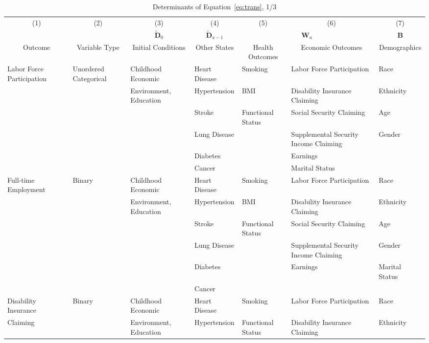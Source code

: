 \begin{table}
\caption{Determinants of Equation~\eqref{eq:trans}, 1/3} \label{table:supertab1}
\begin{scriptsize}
\begin{tabular}{lllllll}
\toprule 
\multicolumn{1}{c}{(1)} & \multicolumn{1}{c}{(2)} & \multicolumn{1}{c}{(3)} & \multicolumn{1}{c}{(4)} & \multicolumn{1}{c}{(5)} & \multicolumn{1}{c}{(6)} & \multicolumn{1}{c}{(7)} \\
 & &  \multicolumn{1}{c}{$\tilde{\bm{D}}_0$} &  \multicolumn{1}{c}{$\tilde{\bm{D}}_{a-1}$} & \multicolumn{2}{c}{ $\bm{W}_a$ } &  \multicolumn{1}{c}{$\bm{B}$} \\ 
\multicolumn{1}{c}{Outcome} & \multicolumn{1}{c}{Variable Type} & \multicolumn{1}{c}{Initial Conditions} & \multicolumn{1}{c}{Other States} & \multicolumn{1}{c}{Health Outcomes} & \multicolumn{1}{c}{Economic Outcomes} & \multicolumn{1}{c}{Demographics} \\
\midrule
Labor Force Participation & Unordered Categorical & Childhood Economic& Heart Disease & Smoking & Labor Force Participation & Race \\
& & Environment, Education & Hypertension & BMI & Disability Insurance Claiming  & Ethnicity \\
& & & Stroke & Functional Status & Social Security Claiming & Age \\
& & & Lung Disease &   & Supplemental Security Income Claiming & Gender \\
& & & Diabetes &  & Earnings &  \\
& & & Cancer &  & Marital Status & \\
\midrule
Full-time Employment & Binary & Childhood Economic & Heart Disease & Smoking & Labor Force Participation & Race \\
& & Environment, Education & Hypertension & BMI & Disability Insurance Claiming  & Ethnicity \\
& & & Stroke & Functional Status & Social Security Claiming & Age \\
& & & Lung Disease &   & Supplemental Security Income Claiming & Gender \\
& & & Diabetes &  & Earnings & Marital Status \\
& & & Cancer &  &  & \\
\midrule			
Disability Insurance  & Binary & Childhood Economic & Heart Disease & Smoking & Labor Force Participation & Race \\
Claiming  & & Environment, Education & Hypertension & Functional Status & Disability Insurance Claiming  & Ethnicity \\

\end{tabular}
\end{scriptsize}
\end{table}
